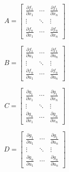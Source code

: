 \begin{center}
\begin{minipage}{0.45\textwidth}
\begin{equation}
  A =
\begin{bmatrix}
\frac{\partial f_{1}}{\partial x_{1}} & \cdots & \frac{\partial f_{1}}{\partial x_{n}} \\
\vdots & \ddots & \vdots \\
\frac{\partial f_{n}}{\partial x_{1}} & \cdots & \frac{\partial f_{n}}{\partial x_{n}}
\end{bmatrix}
\end{equation}
\end{minipage}\hfill
\begin{minipage}{0.45\textwidth}
\begin{equation}
  B =
\begin{bmatrix}
\frac{\partial f_{1}}{\partial u_{1}} & \cdots & \frac{\partial f_{1}}{\partial u_{n}} \\
\vdots & \ddots & \vdots \\
\frac{\partial f_{n}}{\partial u_{1}} & \cdots & \frac{\partial f_{n}}{\partial u_{n}}
\end{bmatrix}
\end{equation}
\end{minipage}

\vspace{1em}

\begin{minipage}{0.45\textwidth}
\begin{equation}
  C =
\begin{bmatrix}
\frac{\partial g_{1}}{\partial x_{1}} & \cdots & \frac{\partial g_{1}}{\partial x_{n}} \\
\vdots & \ddots & \vdots \\
\frac{\partial g_{n}}{\partial x_{1}} & \cdots & \frac{\partial g_{n}}{\partial x_{n}}
\end{bmatrix}
\end{equation}
\end{minipage}\hfill
\begin{minipage}{0.45\textwidth}
\begin{equation}
  D =
\begin{bmatrix}
\frac{\partial g_{1}}{\partial u_{1}} & \cdots & \frac{\partial g_{1}}{\partial u_{n}} \\
\vdots & \ddots & \vdots \\
\frac{\partial g_{n}}{\partial u_{1}} & \cdots & \frac{\partial g_{n}}{\partial u_{n}}
\end{bmatrix}
\end{equation}
\end{minipage}
\end{center}

